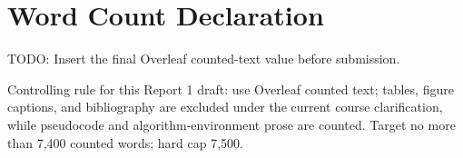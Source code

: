 
\chapter*{\centering \Large Word Count Declaration}

TODO: Insert the final Overleaf counted-text value before submission.

Controlling rule for this Report 1 draft: use Overleaf counted text; tables,
figure captions, and bibliography are excluded under the current course
clarification, while pseudocode and algorithm-environment prose are counted.
Target no more than 7,400 counted words; hard cap 7,500.

